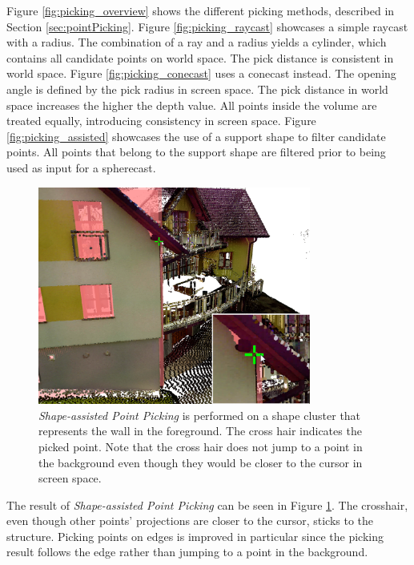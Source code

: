 Figure \ref{fig:picking_overview} shows the different picking methods, described in Section \ref{sec:pointPicking}. Figure \ref{fig:picking_raycast} showcases a simple raycast with a radius. The combination of a ray and a radius yields a cylinder, which contains all candidate points on world space. The pick distance is consistent in world space. Figure \ref{fig:picking_conecast} uses a conecast instead. The opening angle is defined by the pick radius in screen space. The pick distance in world space increases the higher the depth value. All points inside the volume are treated equally, introducing consistency in screen space. Figure \ref{fig:picking_assisted} showcases the use of a support shape to filter candidate points. All points that belong to the support shape are filtered prior to being used as input for a spherecast. 


\begin{figure}
    \centering
    \includegraphics[width=0.8\textwidth]{System_Design/picking_assisted_screenshot.png}%
    \caption{\textit{Shape-assisted Point Picking} is performed on a shape cluster that represents the wall in the foreground. The cross hair indicates the picked point. Note that the cross hair does not jump to a point in the background even though they would be closer to the cursor in screen space. }
    \label{fig:picking_assisted_screenshot}
\end{figure}

The result of \textit{Shape-assisted Point Picking} can be seen in Figure \ref{fig:picking_assisted_screenshot}. The crosshair, even though other points' projections are closer to the cursor, sticks to the structure. Picking points on edges is improved in particular since the picking result follows the edge rather than jumping to a point in the background. 


